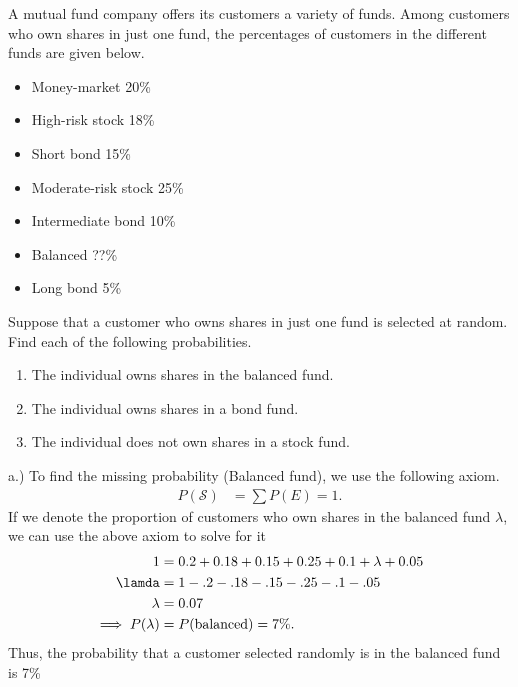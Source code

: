 \documentclass{report}
\begin{document}
    \pagebreak \bigbreak \noindent 
    \begin{mdframed}
        A mutual fund company offers its customers a variety of funds. Among customers who own shares in just one fund, the percentages of customers in the different funds are given below.
        \begin{itemize}
            \item Money-market 20\%
            \item High-risk stock 18\%
            \item Short bond 15\%
            \item Moderate-risk stock 25\%
            \item Intermediate bond 10\%
            \item Balanced ??\%
            \item Long bond 5\%
        \end{itemize}
        Suppose that a customer who owns shares in just one fund is selected at random. Find each of the following probabilities. 
        \begin{enumerate}[label=(\alph*)]
            \item The individual owns shares in the balanced fund.
            \item The individual owns shares in a bond fund.
            \item The individual does not own shares in a stock fund.
        \end{enumerate}
    \end{mdframed}
    \bigbreak \noindent 
    a.) To find the missing probability (Balanced fund), we use the following axiom.
    \begin{align*}
        P(\mathcal{S}) &= \sum P(E) = 1 
    .\end{align*}
    \bigbreak \noindent 
    If we denote the proportion of customers who own shares in the balanced fund $\lambda$, we can use the above axiom to solve for it
    \begin{align*}
        1 &= 0.2 + 0.18 + 0.15 + 0.25 + 0.1 + \lambda + 0.05 \\
          \lamda &= 1 - .2 -.18 -.15 -.25 -.1 -.05 \\
          \lambda &=0.07 \\
          \implies P(\lambda) &= P(\text{balanced}) = 7\%
    .\end{align*}
    \bigbreak \noindent 
    Thus, the probability that a customer selected randomly is in the balanced fund is 7\%
    \bigbreak \noindent 
\end{document}

